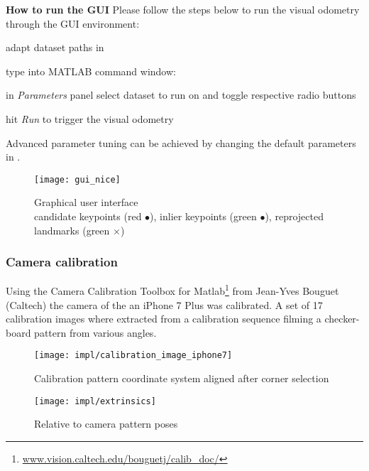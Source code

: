 \textbf{How to run the GUI}
Please follow the steps below to run the visual odometry through the GUI environment:
\begin{compactenum}
	\item adapt dataset paths in 
	\item type into MATLAB command window: 
	\item in \textit{Parameters} panel select dataset to run on and toggle respective radio buttons
	\item hit \textit{Run} to trigger the visual odometry\\
\end{compactenum}

Advanced parameter tuning can be achieved by changing the default parameters in .
\pagebreak 

\begin{figure}[!!!!!!ht]
	\centering
	\texttt{[image: gui\_nice]}
	\captionsetup{justification=centering}
	\caption{Graphical user interface \\candidate keypoints (red $\bullet$), inlier keypoints (green $\bullet$), reprojected landmarks (green $\times$)}
	\label{img_gui}
\end{figure}



\subsubsection{Camera calibration}
Using the Camera Calibration Toolbox for Matlab\footnote{\url{www.vision.caltech.edu/bouguetj/calib_doc/}} from Jean-Yves Bouguet (Caltech) the camera of the an iPhone 7 Plus was calibrated. A set of 17 calibration images where extracted from a calibration sequence filming a checker-board pattern from various angles.

\begin{figure}[htbp]
	\centering
	\begin{minipage}{0.4\textwidth} 
		\centering
		\texttt{[image: impl/calibration\_image\_iphone7]}
		\caption{Calibration pattern coordinate system aligned after corner selection}
		\label{img_calib}
	\end{minipage}
	\begin{minipage}{0.4\textwidth}
		\centering
		\texttt{[image: impl/extrinsics]}
		\caption{Relative to camera pattern poses}
		\label{img_calib} 
	\end{minipage}
\end{figure}


